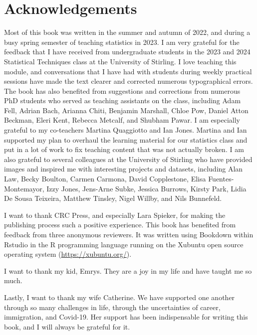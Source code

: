 \documentclass[
  openany]{scrbook}
\begin{document}
\hypertarget{acknowledgements}{%
\section*{Acknowledgements}\label{acknowledgements}}

Most of this book was written in the summer and autumn of 2022, and during a busy spring semester of teaching statistics in 2023.
I am very grateful for the feedback that I have received from undergraduate students in the 2023 and 2024 Statistical Techniques class at the University of Stirling.
I love teaching this module, and conversations that I have had with students during weekly practical sessions have made the text clearer and corrected numerous typographical errors.
The book has also benefited from suggestions and corrections from numerous PhD students who served as teaching assistants on the class, including Adam Fell, Adrian Bach, Arianna Chiti, Benjamin Marshall, Chloe Pow, Daniel Atton Beckman, Eleri Kent, Rebecca Metcalf, and Shubham Pawar.
I am especially grateful to my co-teachers Martina Quaggiotto and Ian Jones.
Martina and Ian supported my plan to overhaul the learning material for our statistics class and put in a lot of work to fix teaching content that was not actually broken.
I am also grateful to several colleagues at the University of Stirling who have provided images and inspired me with interesting projects and datasets, including Alan Law, Becky Boulton, Carmen Carmona, David Copplestone, Elisa Fuentes-Montemayor, Izzy Jones, Jens-Arne Subke, Jessica Burrows, Kirsty Park, Lidia De Sousa Teixeira, Matthew Tinsley, Nigel Willby, and Nils Bunnefeld.

I want to thank CRC Press, and especially Lara Spieker, for making the publishing process such a positive experience.
This book has benefited from feedback from three anonymous reviewers.
It was written using Bookdown \citep{xie2015, Xie2016, Xie2023} within Rstudio \citep{Rstudio} in the R programming language \citep{Rproject} running on the Xubuntu open source operating system (\url{https://xubuntu.org/}).

I want to thank my kid, Emrys.
They are a joy in my life and have taught me so much.

Lastly, I want to thank my wife Catherine.
We have supported one another through so many challenges in life, through the uncertainties of career, immigration, and Covid-19.
Her support has been indispensable for writing this book, and I will always be grateful for it.
\end{document}
